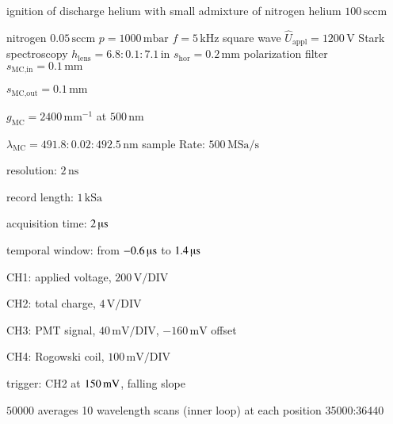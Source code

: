 \begin{Liste}
	\itemwas ignition of discharge
	 helium with small admixture of nitrogen
	 helium $100\,\text{sccm}$
	\item nitrogen $0.05\,\text{sccm}$
	 $p=1000\,\text{mbar}$
	 $f=5\,\text{kHz}$
	 square wave
	 $\hat U_\text{appl}=1200\,\text{V}$
	\leer
	\itemwas Stark spectroscopy
	 $h_\text{lens}=6.8:0.1:7.1\,\text{in}$
	 $s_\text{hor}=0.2\,\text{mm}$
	 polarization filter
 	 $s_\text{MC,in}=0.1\,\text{mm}$
	\item $s_\text{MC,out}=0.1\,\text{mm}$
	\item $g_\text{MC}=2400\,\text{mm}^{-1}$ at $500\,\text{nm}$
	\item $\lambda_\text{MC}=491.8:0.02:492.5\,\text{nm}$
	\leer
	 sample Rate: $500\,\text{MSa}/\text{s}$
	\item resolution: $2\,\text{ns}$
	\item record length: $1\,\text{kSa}$
	\item acquisition time: $2\,\text{\textmu s}$
	\item temporal window: from $-0.6\,\text{\textmu s}$ to $1.4\,\text{\textmu s}$
	\item CH1: applied voltage, $200\,\text{V}/\text{DIV}$
	\item CH2: total charge, $4\,\text{V}/\text{DIV}$
	\item CH3: PMT signal, $40\,\text{mV}/\text{DIV}$, $-160\,\text{mV}$ offset
	\item CH4: Rogowski coil, $100\,\text{mV}/\text{DIV}$
	\item trigger: CH2 at $\-150\,\text{mV}$, falling slope
	\item $50000$ averages
	 10 wavelength scans (inner loop) at each position
	\leer
	 35000:36440
\end{Liste}